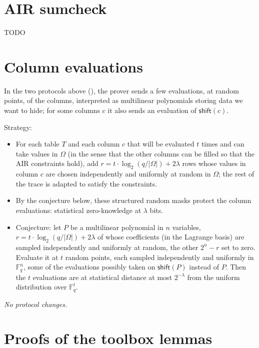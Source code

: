 \documentclass{article}
\newcommand{\Fq}{\mathbb{F}_q}
\theoremstyle{definition}
\begin{document}
\section{AIR sumcheck}\label{sec:zk-air-sumcheck}

TODO

\section{Column evaluations}\label{sec:zk-column-evals}

In the two protocols above (), the prover sends a few evaluations, at random points, of the columns, interpreted as multilinear polynomials storing data we want to hide; for some columns $c$ it also sends an evaluation of $\mathsf{shift}(c)$.

Strategy:
\begin{itemize}
    \item For each table $T$ and each column $c$ that will be evaluated $t$ times and can take values in $\Omega$ (in the sense that the other columns can be filled so that the AIR constraints hold), add $r = t \cdot \log_2(q / |\Omega|) + 2 \lambda$ rows whose values in column $c$ are chosen independently and uniformly at random in $\Omega$; the rest of the trace is adapted to satisfy the constraints.
    \item By the conjecture below, these structured random masks protect the column evaluations: statistical zero-knowledge at $\lambda$ bits.
    \item Conjecture: let $P$ be a multilinear polynomial in $n$ variables, $r = t \cdot \log_2(q / |\Omega|) + 2 \lambda$ of whose coefficients (in the Lagrange basis) are sampled independently and uniformly at random, the other $2^n - r$ set to zero. Evaluate it at $t$ random points, each sampled independently and uniformly in $\Fq^n$, some of the evaluations possibly taken on $\mathsf{shift}(P)$ instead of $P$. Then the $t$ evaluations are at statistical distance at most $2^{-\lambda}$ from the uniform distribution over $\Fq^t$.
\end{itemize}

\textit{No protocol changes.}

\appendix

\section{Proofs of the toolbox lemmas}\label{app:toolbox}
\end{document}

